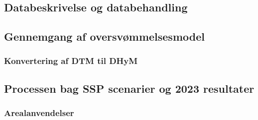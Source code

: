 
\subsection{Databeskrivelse og databehandling}










\subsection{Gennemgang af oversvømmelsesmodel}
\subsubsection{Konvertering af DTM til DHyM}



\subsection{Processen bag SSP scenarier og 2023 resultater}
\subsubsection{Arealanvendelser}